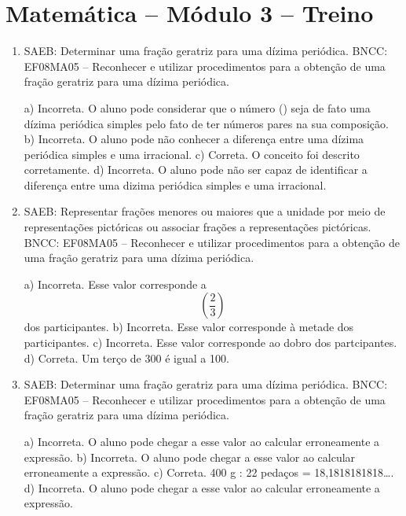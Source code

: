 \section*{Matemática – Módulo 3 – Treino}

\begin{enumerate}
\item SAEB: Determinar uma fração geratriz para uma dízima periódica.
BNCC: EF08MA05 -- Reconhecer e utilizar procedimentos para a obtenção de
uma fração geratriz para uma dízima periódica.

a) Incorreta. O aluno pode considerar que o número (\pi) seja de
fato uma dízima periódica simples pelo fato de ter números pares na sua
composição.
b) Incorreta. O aluno pode não conhecer a diferença entre uma
dízima periódica simples e uma irracional.
c) Correta. O conceito foi descrito corretamente.
d) Incorreta. O aluno pode não ser capaz de identificar a diferença
entre uma dizima periódica simples e uma irracional.

\item SAEB: Representar frações menores ou maiores que a unidade por meio de
representações pictóricas ou associar frações a representações
pictóricas.
BNCC: EF08MA05 -- Reconhecer e utilizar procedimentos para a obtenção de
uma fração geratriz para uma dízima periódica.

a) Incorreta. Esse valor corresponde a $$(\frac{2}{3})$$ dos
participantes.
b) Incorreta. Esse valor corresponde à metade dos participantes.
c) Incorreta. Esse valor corresponde ao dobro dos partcipantes.
d) Correta. Um terço de 300 é igual a 100.


\item SAEB: Determinar uma fração geratriz para uma dízima periódica.
BNCC: EF08MA05 -- Reconhecer e utilizar procedimentos para a obtenção de
uma fração geratriz para uma dízima periódica.

a) Incorreta. O aluno pode chegar a esse valor ao calcular
erroneamente a expressão.
b) Incorreta. O aluno pode chegar a esse valor ao calcular
erroneamente a expressão.
c) Correta. 400 g : 22 pedaços = 18,1818181818\ldots{}.
d) Incorreta. O aluno pode chegar a esse valor ao calcular
erroneamente a expressão.

\end{enumerate}


